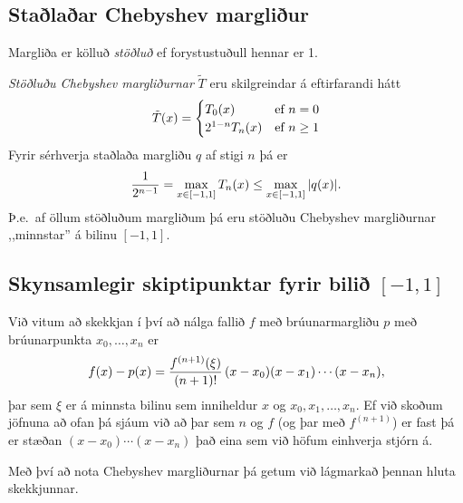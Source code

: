\documentclass[letterpaper,10pt,icelandic]{sphinxmanual}
\begin{document}

\subsection{Staðlaðar Chebyshev margliður}
\label{kafli03:index-16}\label{kafli03:stalaar-chebyshev-margliur}
Margliða er kölluð \emph{stöðluð} ef forystustuðull hennar er 1.

\emph{Stöðluðu Chebyshev margliðurnar} \(\tilde T\) eru skilgreindar á eftirfarandi hátt
\begin{gather}
\begin{split}\tilde T(x) =
    \begin{cases}
      T_0(x) & \text{ef } n = 0 \\
      2^{1-n}T_n(x)   & \text{ef } n\geq 1              \end{cases}\end{split}\notag
\end{gather}
Fyrir sérhverja staðlaða margliðu \(q\) af stigi
\(n\) þá er
\begin{gather}
\begin{split}\frac 1{2^{n-1}} = \max_{x\in [-1,1]} T_n(x) \leq \max_{x\in[-1,1]} |q(x)|.\end{split}\notag
\end{gather}
Þ.e. af öllum stöðluðum margliðum þá eru stöðluðu Chebyshev margliðurnar
,,minnstar” á bilinu \([-1,1]\).


\subsection{Skynsamlegir skiptipunktar fyrir bilið \([-1,1]\)}
\label{kafli03:skynsamlegir-skiptipunktar-fyrir-bili}
Við vitum að skekkjan í því að nálga fallið \(f\) með
brúunarmargliðu \(p\) með brúunarpunkta \(x_0,\ldots,x_n\) er
\begin{gather}
\begin{split}f(x)-p(x) = \frac{f^{(n+1)}(\xi)}{(n+1)!}\, (x-x_0)(x-x_1)\cdots (x-x_n),\end{split}\notag
\end{gather}
þar sem \(\xi\) er á minnsta bilinu sem inniheldur \(x\) og
\(x_0,x_1,\ldots,x_n\). Ef við skoðum jöfnuna að ofan þá sjáum við
að þar sem \(n\) og \(f\) (og þar með \(f^{(n+1)}\)) er fast
þá er stæðan \((x-x_0)\cdots(x-x_n)\) það eina sem við höfum
einhverja stjórn á.

Með því að nota Chebyshev margliðurnar þá getum við lágmarkað þennan
hluta skekkjunnar.
\end{document}
